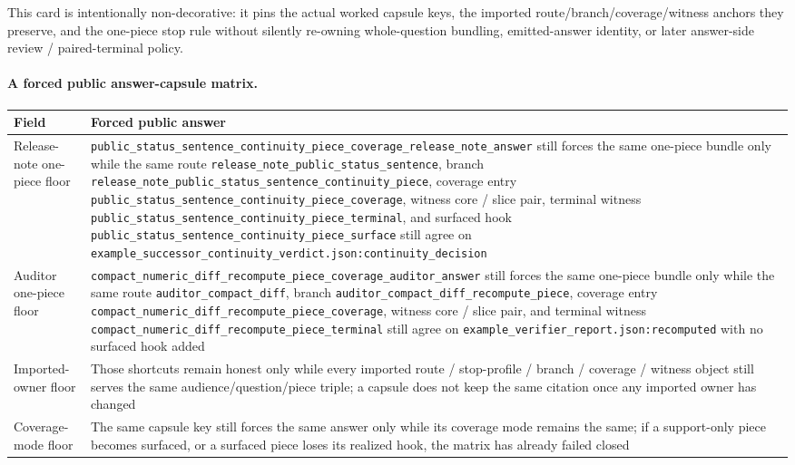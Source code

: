 \documentclass[11pt]{article}
\begin{document}
This card is intentionally non-decorative: it pins the actual worked capsule keys, the imported route/branch/coverage/witness anchors they preserve, and the one-piece stop rule without silently re-owning whole-question bundling, emitted-answer identity, or later answer-side review / paired-terminal policy.\cite{series:workedexample}

\paragraph{A forced public answer-capsule matrix.}
\begin{table}[t]
\centering
\small
\begin{tabularx}{\linewidth}{@{}lX@{}}
\toprule
Field & Forced public answer \\
\midrule
Release-note one-piece floor & \nolinkurl{public_status_sentence_continuity_piece_coverage_release_note_answer} still forces the same one-piece bundle only while the same route \nolinkurl{release_note_public_status_sentence}, branch \nolinkurl{release_note_public_status_sentence_continuity_piece}, coverage entry \nolinkurl{public_status_sentence_continuity_piece_coverage}, witness core / slice pair, terminal witness \nolinkurl{public_status_sentence_continuity_piece_terminal}, and surfaced hook \nolinkurl{public_status_sentence_continuity_piece_surface} still agree on \nolinkurl{example_successor_continuity_verdict.json:continuity_decision} \\
Auditor one-piece floor & \nolinkurl{compact_numeric_diff_recompute_piece_coverage_auditor_answer} still forces the same one-piece bundle only while the same route \nolinkurl{auditor_compact_diff}, branch \nolinkurl{auditor_compact_diff_recompute_piece}, coverage entry \nolinkurl{compact_numeric_diff_recompute_piece_coverage}, witness core / slice pair, and terminal witness \nolinkurl{compact_numeric_diff_recompute_piece_terminal} still agree on \nolinkurl{example_verifier_report.json:recomputed} with no surfaced hook added \\
Imported-owner floor & Those shortcuts remain honest only while every imported route / stop-profile / branch / coverage / witness object still serves the same audience/question/piece triple; a capsule does not keep the same citation once any imported owner has changed \\
Coverage-mode floor & The same capsule key still forces the same answer only while its coverage mode remains the same; if a support-only piece becomes surfaced, or a surfaced piece loses its realized hook, the matrix has already failed closed \\

\end{tabularx}
\end{table}
\end{document}
